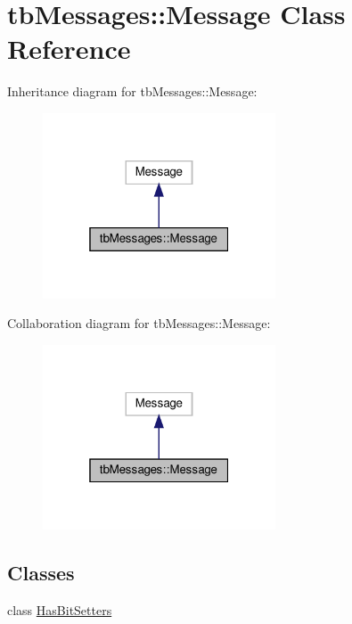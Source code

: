 \hypertarget{classtbMessages_1_1Message}{}\section{tb\+Messages\+:\+:Message Class Reference}
\label{classtbMessages_1_1Message}


Inheritance diagram for tb\+Messages\+:\+:Message\+:
\nopagebreak
\begin{figure}[H]
\begin{center}
\leavevmode
\includegraphics[width=196pt]{classtbMessages_1_1Message__inherit__graph}
\end{center}
\end{figure}


Collaboration diagram for tb\+Messages\+:\+:Message\+:
\nopagebreak
\begin{figure}[H]
\begin{center}
\leavevmode
\includegraphics[width=196pt]{classtbMessages_1_1Message__coll__graph}
\end{center}
\end{figure}
\subsection*{Classes}
\begin{DoxyCompactItemize}
\item 
class \hyperlink{classtbMessages_1_1Message_1_1HasBitSetters}{Has\+Bit\+Setters}
\end{DoxyCompactItemize}
